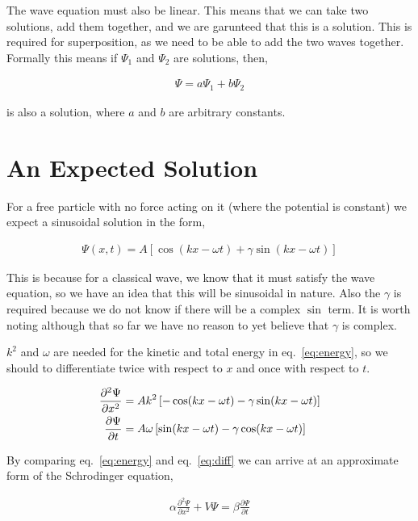 \documentclass[11pt]{amsart}
\begin{document}
The wave equation must also be linear. This means that we can take two solutions, add them together, and we are garunteed that this is a solution. This is required for superposition, as we need to be able to add the two waves together. Formally this means if $\Psi_1$ and $\Psi_2$ are solutions, then,

\begin{align*}
\Psi = a\Psi_1 + b\Psi_2
\end{align*}

is also a solution, where $a$ and $b$ are arbitrary constants.

\section{An Expected Solution}

For a free particle with no force acting on it (where the potential is constant) we expect a sinusoidal solution in the form,

\begin{align*}
\Psi(x, t) = A\left[\cos(kx - \omega t) + \gamma \sin(kx - \omega t)\right]
\end{align*}

This is because for a classical wave, we know that it must satisfy the wave equation, so we have an idea that this will be sinusoidal in nature. Also the $\gamma$ is required because we do not know if there will be a complex $\sin$ term. It is worth noting although that so far we have no reason to yet believe that $\gamma$ is complex.

$k^2$ and $\omega$ are needed for the kinetic and total energy in eq.~\ref{eq:energy}, so we should to differentiate twice with respect to $x$ and once with respect to $t$.

\begin{align}
\label{eq:diff}
\frac{\partial^2 \Psi}{\partial x^2} &= Ak^2 \left[-\cos(kx - \omega t) - \gamma \sin(kx - \omega t)\right] \\
\frac{\partial \Psi}{\partial t} &= A \omega \left[\sin(kx - \omega t) - \gamma \cos(kx - \omega t)\right] \notag
\end{align}

By comparing eq.~\ref{eq:energy} and eq.~\ref{eq:diff} we can arrive at an approximate form of the Schrodinger equation,

\begin{align}
\label{eq:almost}
\alpha \frac{\partial^2 \Psi}{\partial x^2} + V \Psi = \beta \frac{\partial \Psi}{\partial t}
\end{align}
\end{document}
